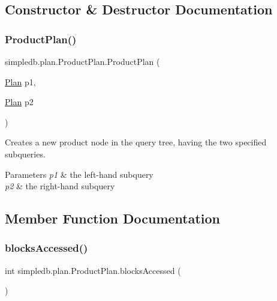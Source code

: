 \subsection{Constructor \& Destructor Documentation}
\mbox{\label{classsimpledb_1_1plan_1_1ProductPlan_a1f6d8e3f0afa2edd6ea6a29997897041}} 
\subsubsection{\texorpdfstring{Product\+Plan()}{ProductPlan()}}
{\footnotesize\ttfamily simpledb.\+plan.\+Product\+Plan.\+Product\+Plan (\begin{DoxyParamCaption}\item[{\hyperlink{interfacesimpledb_1_1plan_1_1Plan}{Plan}}]{p1,  }\item[{\hyperlink{interfacesimpledb_1_1plan_1_1Plan}{Plan}}]{p2 }\end{DoxyParamCaption})\hspace{0.3cm}{\ttfamily [inline]}}

Creates a new product node in the query tree, having the two specified subqueries. 
\begin{DoxyParams}{Parameters}
{\em p1} & the left-\/hand subquery \\
\hline
{\em p2} & the right-\/hand subquery \\
\hline
\end{DoxyParams}


\subsection{Member Function Documentation}
\mbox{\label{classsimpledb_1_1plan_1_1ProductPlan_aed99978816a650c8f9268bb842d75a5b}} 
\subsubsection{\texorpdfstring{blocks\+Accessed()}{blocksAccessed()}}
{\footnotesize\ttfamily int simpledb.\+plan.\+Product\+Plan.\+blocks\+Accessed (\begin{DoxyParamCaption}{ }\end{DoxyParamCaption})\hspace{0.3cm}{\ttfamily [inline]}}

